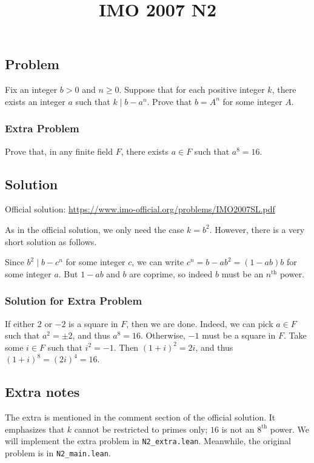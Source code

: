 \documentclass{article}
\title{IMO 2007 N2}
\author{}
\date{}
\begin{document}
\maketitle



\subsection*{Problem}

Fix an integer $b > 0$ and $n \geq 0$.
Suppose that for each positive integer $k$, there exists an integer $a$ such that $k \mid b - a^n$.
Prove that $b = A^n$ for some integer $A$.


\subsubsection*{Extra Problem}

Prove that, in any finite field $F$, there exists $a \in F$ such that $a^8 = 16$.



\subsection*{Solution}

Official solution: \url{https://www.imo-official.org/problems/IMO2007SL.pdf}

As in the official solution, we only need the case $k = b^2$.
However, there is a very short solution as follows.

Since $b^2 \mid b - c^n$ for some integer $c$, we can write $c^n = b - ab^2 = (1 - ab) b$ for some integer $a$.
But $1 - ab$ and $b$ are coprime, so indeed $b$ must be an $n^{\text{th}}$ power.



\subsubsection*{Solution for Extra Problem}

If either $2$ or $-2$ is a square in $F$, then we are done.
Indeed, we can pick $a \in F$ such that $a^2 = \pm 2$, and thus $a^8 = 16$.
Otherwise, $-1$ must be a square in $F$.
Take some $i \in F$ such that $i^2 = -1$.
Then $(1 + i)^2 = 2i$, and thus $(1 + i)^8 = (2i)^4 = 16$.



\subsection*{Extra notes}

The extra is mentioned in the comment section of the official solution.
It emphasizes that $k$ cannot be restricted to primes only; $16$ is not an $8^{\text{th}}$ power.
We will implement the extra problem in \texttt{N2\_extra.lean}.
Meanwhile, the original problem is in \texttt{N2\_main.lean}.
\end{document}
